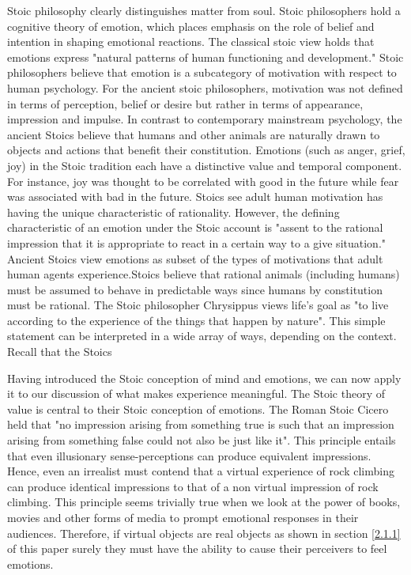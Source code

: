 Stoic philosophy clearly distinguishes matter from soul. \cite{gould2012the} Stoic philosophers hold a cognitive theory of emotion, which places emphasis on the role of belief and intention in shaping emotional reactions. The classical stoic view holds that emotions express "natural patterns of human functioning and development." \cite{goldie2010the} Stoic philosophers believe that emotion is a subcategory of motivation with respect to human psychology. For the ancient stoic philosophers, motivation was not defined in terms of perception, belief or desire but rather in terms of appearance, impression and impulse. In contrast to contemporary mainstream psychology, the ancient Stoics believe that humans and other animals are naturally drawn to objects and actions that benefit their constitution. Emotions (such as anger, grief, joy) in the Stoic tradition each have a distinctive value and temporal component. For instance, joy was thought to be correlated with good in the future while fear was associated with bad in the future. Stoics see adult human motivation has having the unique characteristic of rationality. However, the defining characteristic of an emotion under the Stoic account is "assent to the rational impression that it is appropriate to react in a certain way to a give situation."  \cite{goldie2010the}
Ancient Stoics view emotions as subset of the types of motivations that adult human agents experience.Stoics believe that rational animals (including humans) must be assumed to behave in predictable ways since humans by constitution must be rational. The Stoic philosopher Chrysippus views life's goal as "to live according to the experience of the things that happen by nature". \cite{goldie2010the} This simple statement can be interpreted in a wide array of ways, depending on the context. Recall that the Stoics

Having introduced the Stoic conception of mind and emotions, we can now apply it to our discussion of what makes experience meaningful. The Stoic theory of value is central to their Stoic conception of emotions. The Roman Stoic Cicero held that "no impression arising from something true is such that an impression arising from something false could not also be just like it". \cite{sep-stoicism}
This principle entails that even illusionary sense-perceptions  can produce equivalent impressions.  Hence, even an irrealist must contend that a virtual experience of rock climbing can produce identical impressions to that of a non virtual impression of rock climbing. This principle seems trivially true when we look at the power of books, movies and other forms of media to prompt emotional responses in their audiences. Therefore, if virtual objects are real objects as shown in section \ref{2.1.1} of this paper surely they must have the ability to cause their perceivers to feel emotions.  

